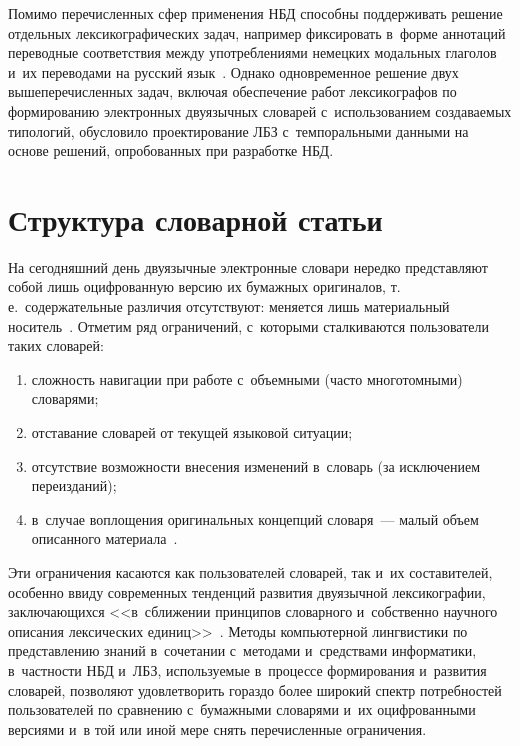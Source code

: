 \begin{multicols}{2}
    Помимо перечисленных сфер применения НБД способны поддерживать 
решение отдельных лексикографических задач, например фиксировать 
в~форме аннотаций переводные соответствия между употреблениями 
немецких модальных глаголов и~их переводами на русский  
язык~\cite{3-gon, 7-gon}. Однако одновременное решение двух 
вышеперечисленных задач, включая обеспечение работ лексикографов по 
формированию электронных двуязычных словарей с~использованием 
создаваемых типологий, обусловило проектирование ЛБЗ с~темпоральными 
данными на основе решений, опробованных при разработке НБД.
    
\vspace*{-6pt}

\section{Структура словарной статьи}

\vspace*{-2pt}

    На сегодняшний день двуязычные электронные словари нередко 
представляют собой лишь оциф\-ро\-ван\-ную версию их бумажных оригиналов, 
т.\,е.\ содержательные различия отсутствуют: меняется лишь материальный 
носитель~\cite{18-gon}. Отметим ряд ограничений, с~которыми сталкиваются 
пользователи таких словарей:
    \begin{enumerate}[(1)]
\item сложность навигации при работе с~объемными (часто 
многотомными) словарями;
\item отставание словарей от текущей языковой ситуации;
\item отсутствие возможности внесения изменений в~словарь (за 
исключением переизданий);
\item в~случае воплощения оригинальных концепций словаря~--- малый 
объем описанного материала~\cite{18-gon, 19-gon}.
\end{enumerate}

    Эти ограничения касаются как пользователей словарей, так и~их 
составителей, особенно ввиду современных тенденций развития двуязычной 
лексикографии, заключающихся <<в~сближении принципов словарного 
и~собственно научного описания лексических  
единиц>>~\cite[с.~35]{20-gon}. Методы компьютерной лингвистики по 
представлению знаний в~сочетании с~методами и~средствами информатики, 
в~частности НБД и~ЛБЗ, используемые в~процессе формирования и~развития 
словарей, позволяют удовлетворить гораздо более широкий спектр 
потребностей пользователей по сравнению с~бумажными словарями и~их 
оцифрованными версиями и~в той или иной мере снять перечисленные 
ограничения. 
    

\end{multicols}
